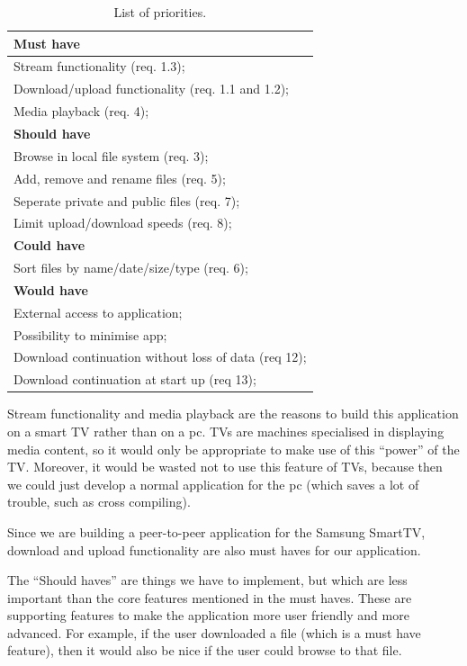 \begin{table}[h!]
\centering
\begin{tabular}{|l|}
\hline
\textbf{Must have}\\ \hline
Stream functionality (req. 1.3); \\
Download/upload functionality (req. 1.1 and 1.2); \\
Media playback (req. 4); \\ \hline

\textbf{Should have}\\ \hline
Browse in local file system (req. 3); \\
Add, remove and rename files (req. 5); \\
Seperate private and public files (req. 7); \\
Limit upload/download speeds (req. 8); \\ \hline

\textbf{Could have}\\ \hline
Sort files by name/date/size/type (req. 6); \\ \hline

\textbf{Would have}\\ \hline
External access to application; \\
Possibility to minimise app; \\
Download continuation without loss of data (req 12); \\
Download continuation at start up (req 13); \\ \hline
\end{tabular}
\caption{List of priorities.}
\label{tab:MosCoW}
\end{table}

Stream functionality and media playback are the reasons to build this application on a smart 
TV rather than on a pc.
TV\textquotesingle s are machines specialised in displaying media content, so it would only 
be appropriate to make use of this ``power'' of the TV.
Moreover, it would be wasted not to use this feature of TV\textquotesingle s, because then we 
could just develop a normal application for the pc (which saves a lot of trouble, such as 
cross compiling).

Since we are building a peer-to-peer application for the Samsung SmartTV, download and upload 
functionality are also must haves for our application.

The ``Should haves'' are things we have to implement, but which are less important than the 
core features mentioned in the must haves. These are
supporting features to make the application more user friendly and more advanced. For 
example, if the user downloaded a file (which is a must have feature),
 then it would also be nice if the user could browse to that file.


